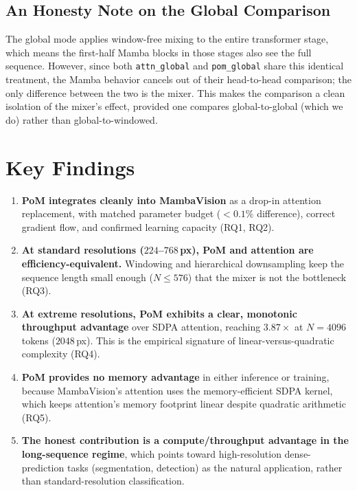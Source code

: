 \documentclass[11pt,a4paper]{article}
\begin{document}
\subsection{An Honesty Note on the Global Comparison}

The global mode applies window-free mixing to the entire transformer stage, which means the first-half Mamba blocks in those stages also see the full sequence. However, since both \texttt{attn\_global} and \texttt{pom\_global} share this identical treatment, the Mamba behavior cancels out of their head-to-head comparison; the only difference between the two is the mixer. This makes the comparison a clean isolation of the mixer's effect, provided one compares global-to-global (which we do) rather than global-to-windowed.

\section{Key Findings}

\begin{enumerate}[leftmargin=1.6em]
    \item \textbf{PoM integrates cleanly into MambaVision} as a drop-in attention replacement, with matched parameter budget ($<0.1\%$ difference), correct gradient flow, and confirmed learning capacity (RQ1, RQ2).
    \item \textbf{At standard resolutions ($224$--$768$\,px), PoM and attention are efficiency-equivalent.} Windowing and hierarchical downsampling keep the sequence length small enough ($N \le 576$) that the mixer is not the bottleneck (RQ3).
    \item \textbf{At extreme resolutions, PoM exhibits a clear, monotonic throughput advantage} over SDPA attention, reaching $3.87\times$ at $N=4096$ tokens ($2048$\,px). This is the empirical signature of linear-versus-quadratic complexity (RQ4).
    \item \textbf{PoM provides no memory advantage} in either inference or training, because MambaVision's attention uses the memory-efficient SDPA kernel, which keeps attention's memory footprint linear despite quadratic arithmetic (RQ5).
    \item \textbf{The honest contribution is a compute/throughput advantage in the long-sequence regime}, which points toward high-resolution dense-prediction tasks (segmentation, detection) as the natural application, rather than standard-resolution classification.
\end{enumerate}
\end{document}
